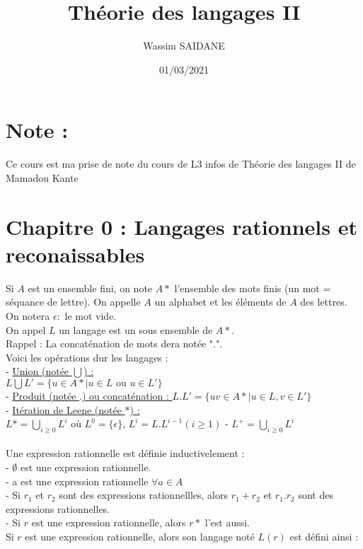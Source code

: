 \documentclass{article}
\title{Théorie des langages II}
\author{Wassim SAIDANE}
\date{01/03/2021}
\begin{document}
    \maketitle
    \section*{Note : }
    Ce cours est ma prise de note du cours de L3 infos de Théorie des langages II de Mamadou Kante
    \section*{Chapitre 0 : Langages rationnels et reconaissables}
    Si $A$ est un ensemble fini, on note $A*$ l'ensemble des mots finis (un mot = séquance de lettre). 
    On appelle $A$ un alphabet et les éléments de $A$ des lettres. \\ 
    On notera $\epsilon : $ le mot vide. \\ 
    On appel $L$ un langage est un sous ensemble de $A*$. \\ 
    Rappel : La concaténation de mots dera notée ".". \\
    Voici les opérations dur les langages : \\ 
    - \underline{Union (notée $\bigcup$) : }\\
    $L \bigcup L'=\{u \in A* \mid u \in L \text{ ou } u \in L'\}$ \\
    - \underline{Produit (notée $.$) ou concaténation : }
    $L . L'=\{uv \in A* \mid u \in L, v \in L'\}$ \\
    - \underline{Itération de Leene (notée $*$) : } \\
    $L*= \bigcup_{i \ge 0} L^{i} \text{ où } L^{0}=\{\epsilon\}$, $L^i=L.L^{i-1} (i \ge 1)$
    - $L^{+}=\bigcup_{i \ge 0} L^{i}$ \\
    \\
    Une expression rationnelle est définie inductivelement : \\ 
    - $\emptyset$ est une expression rationnelle. \\ 
    - a est une expression rationnelle $\forall a \in A$ \\ 
    - Si $r_1$ et $r_2$ sont des expressions rationnellles, alors $r_1+r_2$ et $r_1.r_2$ sont des expressions rationnelles. \\
    - Si $r$ est une expression rationnelle, alors $r*$ l'est aussi. 
    \\
    Si $r$ est une expression rationnelle, alors son langage noté $L(r)$ est défini ainsi : 
\end{document}
